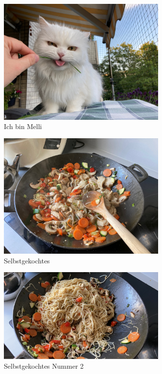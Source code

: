 \documentclass[ngerman,12pt]{scrartcl}
\begin{document}
\begin{figure}[t] %
\centering
\includegraphics[width=0.75\textwidth]{Bilder/melli} %
\caption{Ich bin Melli}\label{fig:melli2}
\end{figure}

\blindtext[3]

\begin{figure}[t] %
\centering
\includegraphics[width=0.75\textwidth]{Bilder/essen1} %
\caption{Selbstgekochtes}\label{fig:essen1}
\end{figure}

\begin{figure}[t] %
\centering
\includegraphics[width=0.75\textwidth]{Bilder/essen2} %
\caption{Selbstgekochtes Nummer 2}\label{fig:essen2}
\end{figure}
\end{document}
